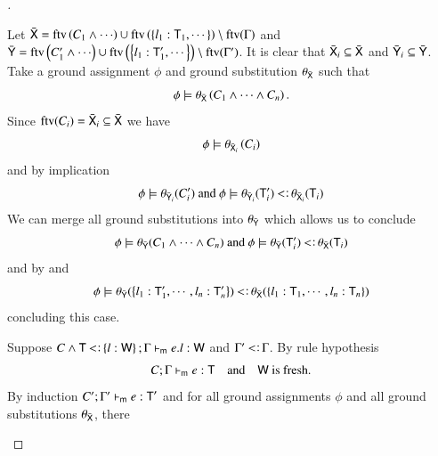 \documentclass{report}
\begin{document}
\begin{proof}[]
\begin{indcase}{\sdrec}
	  Let $\bar{\textsf{X}}=\mathop{\rm ftv}\nolimits\left({C_1\land\cdots}\right)\cup\mathop{\rm ftv}\nolimits\left({\left\{l_1:\textsf{T}_1,\cdots\right\}}\right)\setminus\mathop{\rm ftv}\nolimits(\Gamma)$ and
	  $\bar{\textsf{Y}}=\mathop{\rm ftv}\nolimits\left({C_1'\land\cdots}\right)\cup\mathop{\rm ftv}\nolimits\left({\left\{l_1:\textsf{T}_1',\cdots\right\}}\right)\setminus\mathop{\rm ftv}\nolimits(\Gamma')$.
	  It is clear
	  that $\bar{\textsf{X}}_i\subseteq\bar{\textsf{X}}$ and $\bar{\textsf{Y}}_i\subseteq\bar{\textsf{Y}}$.
	  Take a ground assignment $\phi$ and ground substitution $\theta_{\bar{\textsf{X}}}$ such that
	  \begin{displaymath}
	    \phi\models\theta_{\bar{\textsf{X}}}\left({C_1\land\cdots \land C_n}\right)\textrm{.}
	  \end{displaymath}
	  Since $\mathop{\rm ftv}\nolimits(C_i)=\bar{\textsf{X}}_i\subseteq\bar{\textsf{X}}$ we have
	  \begin{displaymath}
	    \phi\models\theta_{\bar{\textsf{X}}_i}\left({C_i}\right)
	  \end{displaymath}
	  and by implication
	  \begin{displaymath}
        \phi\csat\theta_{\bar{\type{Y}}_i}(C_i')\textrm{ and }
        \phi\csat\theta_{\bar{\type{Y}}_i}(\type{T}_i')\subtype\theta_{\bar{\type{X}}_i}(\type{T}_i)
      \end{displaymath}
      We can merge all ground substitutions into $\theta_{\bar{\textsf{Y}}}$ which allows us to conclude
	  \begin{displaymath}
        \phi\csat\theta_{\bar{\type{Y}}}(C_1\land\cdots\land C_n)\textrm{ and }
        \phi\csat\theta_{\bar{\type{Y}}}(\type{T}_i')\subtype\theta_{\bar{\type{X}}}(\type{T}_i)
      \end{displaymath}
      and by \srec and \csub
	  \begin{displaymath}
        \phi\csat\theta_{\bar{\type{Y}}}(\set{l_1:\type{T}_1',\cdots,l_n:\type{T}_n'})\subtype\theta_{\bar{\type{X}}}(\set{l_1:\type{T}_1,\cdots,l_n:\type{T}_n})
      \end{displaymath}
      concluding this case.
    \end{indcase}
    \begin{indcase}{\sdsel}
      Suppose $C\land\type{T}\subtype\set{l:\type{W}};\Gamma\entailsm e.l:\type{W}$
      and $\Gamma'\subtype\Gamma$.
      By rule hypothesis
      \begin{displaymath}
        C;\Gamma\vdash_\textsf{m} e:\textsf{T}\quad\textrm{and}\quad
        \textsf{W}\textrm{ is fresh}\textrm{.}
      \end{displaymath}
      By induction $C';\Gamma'\vdash_\textsf{m} e:\textsf{T}'$ and for all
      ground assignments $\phi$ and all ground substitutions $\theta_{\bar{\textsf{X}}}$, there

\end{indcase}
\end{proof}
\end{document}
